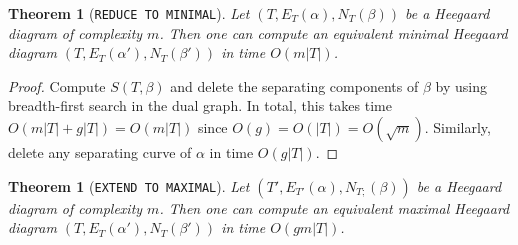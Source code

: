 \documentclass[11pt]{amsart}
\numberwithin{equation}{section}
\theoremstyle{plain}
\newtheorem{theorem}[equation]{Theorem}
\theoremstyle{definition}
\begin{document}
\begin{theorem}[\texttt{REDUCE TO MINIMAL}]
    Let $(T,E_T(\alpha),N_T(\beta))$ be a Heegaard diagram of complexity $m$. Then one can compute an equivalent minimal Heegaard diagram $(T,E_T(\alpha'),N_T(\beta'))$ in time $O(m|T|)$.
\end{theorem}
\begin{proof}
    Compute $S(T,\beta)$ and delete the separating components of $\beta$ by using breadth-first search in the dual graph. 
    In total, this takes time $O(m|T|+g|T|)=O(m|T|)$ since $O(g)=O(|T|)=O(\sqrt{m})$. 
    Similarly, delete any separating curve of $\alpha$ in time $O(g|T|)$. 
\end{proof}

\begin{theorem}[\texttt{EXTEND TO MAXIMAL}]\label{th: extend to maximal}
    Let $(T',E_{T'}(\alpha),N_{T;}(\beta))$ be a Heegaard diagram of complexity $m$. Then one can compute an equivalent maximal Heegaard diagram $(T,E_T(\alpha'),N_T(\beta'))$ in time $O(gm|T|)$.
\end{theorem}
\end{document}
